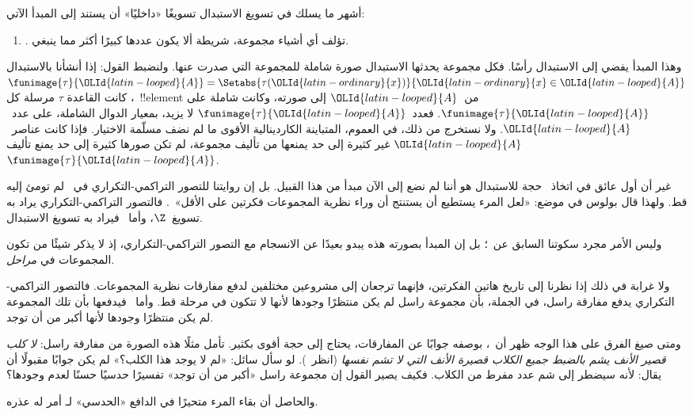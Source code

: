 \documentclass[../../../include/open-logic-section]{subfiles}
\begin{document}

أشهر ما يسلك في تسويغ الاستبدال تسويغًا «داخليًا» أن يستند إلى
المبدأ الآتي:
\begin{enumerate}
	\item[] \limofsize. تؤلف أي أشياء مجموعة، شريطة ألا يكون عددها
	كبيرًا أكثر مما ينبغي.
\end{enumerate}
وهذا المبدأ يفضي إلى الاستبدال رأسًا. فكل مجموعة يحدثها الاستبدال صورة
شاملة للمجموعة التي صدرت عنها. ولنضبط القول: إذا أنشأنا بالاستبدال
$\funimage{\tau}{\OLId{latin-looped}{A}} = \Setabs{\tau(\OLId{latin-ordinary}{x})}{\OLId{latin-ordinary}{x} \in \OLId{latin-looped}{A}}$، كانت القاعدة
$\tau$ مرسلة كل~!!{element} من~$\OLId{latin-looped}{A}$ إلى صورته، وكانت شاملة على
$\funimage{\tau}{\OLId{latin-looped}{A}}$. فعدد~$\funimage{\tau}{\OLId{latin-looped}{A}}$ لا يزيد، بمعيار
الدوال الشاملة، على عدد~$\OLId{latin-looped}{A}$. ولا نستخرج من ذلك، في العموم، المتباينة
الكاردينالية الأقوى ما لم نضف مسلّمة الاختيار. فإذا كانت عناصر~$\OLId{latin-looped}{A}$
غير كثيرة إلى حد يمنعها من تأليف مجموعة، لم تكن صورها كثيرة إلى حد
يمنع تأليف~$\funimage{\tau}{\OLId{latin-looped}{A}}$.

غير أن أول عائق في اتخاذ~\limofsize{} حجة للاستبدال هو أننا لم نضع
إلى الآن مبدأ من هذا القبيل. بل إن روايتنا للتصور التراكمي-التكراري
في~ لم تومئ إليه قط. ولهذا
قال بولوس في موضع: «لعل المرء يستطيع أن يستنتج أن وراء نظرية
المجموعات فكرتين على الأقل»~\citeyearpar[p.~19]{Boolos1989}. فالتصور
التراكمي-التكراري يراد به تسويغ~$\Z$، وأما~\limofsize{} فيراد به
تسويغ الاستبدال.

وليس الأمر مجرد سكوتنا السابق عن~\limofsize؛ بل إن المبدأ بصورته
هذه يبدو بعيدًا عن الانسجام مع التصور التراكمي-التكراري، إذ لا يذكر
شيئًا من تكون المجموعات في \emph{مراحل}.

ولا غرابة في ذلك إذا نظرنا إلى تاريخ هاتين الفكرتين، فإنهما ترجعان
إلى مشروعين مختلفين لدفع مفارقات نظرية المجموعات. فالتصور
التراكمي-التكراري يدفع مفارقة راسل، في الجملة، بأن مجموعة راسل لم يكن
منتظرًا وجودها لأنها لا تتكون في مرحلة قط. وأما~\limofsize{} فيدفعها
بأن تلك المجموعة لم يكن منتظرًا وجودها لأنها أكبر من أن توجد.

ومتى صيغ الفرق على هذا الوجه ظهر أن~\limofsize{}، بوصفه جوابًا عن
المفارقات، يحتاج إلى حجة أقوى بكثير. تأمل مثلًا هذه الصورة من مفارقة
راسل: \emph{لا كلب قصير الأنف يشم بالضبط جميع الكلاب قصيرة الأنف
التي لا تشم نفسها} (انظر~). لو سأل سائل:
«لم لا يوجد هذا الكلب؟» لم يكن جوابًا مقبولًا أن يقال: لأنه سيضطر إلى
شم عدد مفرط من الكلاب. فكيف يصير القول إن مجموعة راسل «أكبر من أن
توجد» تفسيرًا حدسيًا حسنًا لعدم وجودها؟

والحاصل أن بقاء المرء متحيرًا في الدافع «الحدسي» لـ\limofsize{} أمر
له عذره.
\end{document}
